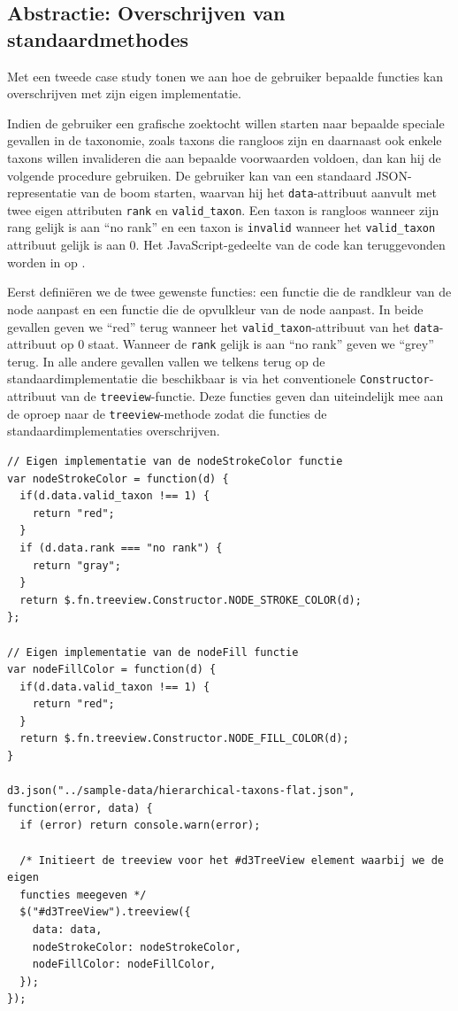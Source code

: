 \subsection{Abstractie: Overschrijven van standaardmethodes}
Met een tweede case study tonen we aan hoe de gebruiker bepaalde functies kan
overschrijven met zijn eigen implementatie.

Indien de gebruiker een grafische zoektocht willen starten naar bepaalde
speciale gevallen in de taxonomie, zoals taxons die rangloos zijn en daarnaast
ook enkele taxons willen invalideren die aan bepaalde voorwaarden voldoen, dan
kan hij de volgende procedure gebruiken. De gebruiker kan van een standaard
JSON-representatie van de boom starten, waarvan hij het \texttt{data}-attribuut
aanvult met twee eigen attributen \texttt{rank} en \texttt{valid\_taxon}. Een
taxon is rangloos wanneer zijn rang gelijk is aan ``no rank'' en een taxon is
\texttt{invalid} wanneer het \texttt{valid\_taxon} attribuut gelijk is aan $0$.
Het JavaScript-gedeelte van de code kan teruggevonden worden in
 op .

Eerst definiëren we de twee gewenste functies: een functie die de randkleur van
de node aanpast en een functie die de opvulkleur van de node aanpast. In beide
gevallen geven we ``red'' terug wanneer het \texttt{valid\_taxon}-attribuut van
het \texttt{data}-attribuut op 0 staat. Wanneer de \texttt{rank} gelijk is aan
``no rank'' geven we ``grey'' terug. In alle andere gevallen vallen we telkens
terug op de standaardimplementatie die beschikbaar is via het conventionele
\texttt{Constructor}-attribuut van de \texttt{treeview}-functie. Deze functies
geven dan uiteindelijk mee aan de oproep naar de \texttt{treeview}-methode zodat
die functies de standaardimplementaties overschrijven.

\begin{lstlisting}[caption={JavaScriptgedeelte van de voorbeeldcode ter 
illustratie van 
abstractie van de \texttt{treeview}-visualisatie},label={lst:visexample3}, 
float]
// Eigen implementatie van de nodeStrokeColor functie
var nodeStrokeColor = function(d) {
  if(d.data.valid_taxon !== 1) {
    return "red";
  }
  if (d.data.rank === "no rank") {
    return "gray";
  }
  return $.fn.treeview.Constructor.NODE_STROKE_COLOR(d);
};

// Eigen implementatie van de nodeFill functie
var nodeFillColor = function(d) {
  if(d.data.valid_taxon !== 1) {
    return "red";
  }
  return $.fn.treeview.Constructor.NODE_FILL_COLOR(d);
}

d3.json("../sample-data/hierarchical-taxons-flat.json", 
function(error, data) {
  if (error) return console.warn(error);

  /* Initieert de treeview voor het #d3TreeView element waarbij we de eigen 
  functies meegeven */
  $("#d3TreeView").treeview({
    data: data,
    nodeStrokeColor: nodeStrokeColor,
    nodeFillColor: nodeFillColor,
  });
});
\end{lstlisting}

